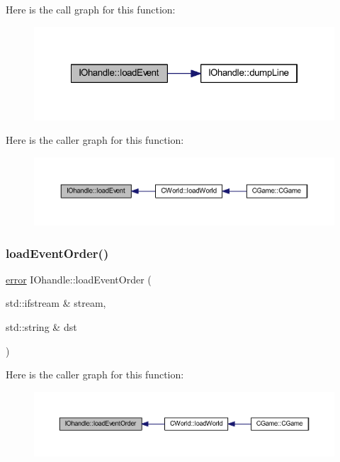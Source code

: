 Here is the call graph for this function\+:\nopagebreak
\begin{figure}[H]
\begin{center}
\leavevmode
\includegraphics[width=322pt]{class_i_ohandle_a42f66760fa3e33400921dcb8d9a8cd57_cgraph}
\end{center}
\end{figure}
Here is the caller graph for this function\+:\nopagebreak
\begin{figure}[H]
\begin{center}
\leavevmode
\includegraphics[width=350pt]{class_i_ohandle_a42f66760fa3e33400921dcb8d9a8cd57_icgraph}
\end{center}
\end{figure}
\mbox{\label{class_i_ohandle_a8d076d0076c358e63e1e993309c35b2a}} 
\subsubsection{\texorpdfstring{load\+Event\+Order()}{loadEventOrder()}}
{\footnotesize\ttfamily \mbox{\hyperlink{_errors_list_8h_af10dacfa214e2575bb2e0ee407c242e0}{error}} I\+Ohandle\+::load\+Event\+Order (\begin{DoxyParamCaption}\item[{std\+::ifstream \&}]{stream,  }\item[{std\+::string \&}]{dst }\end{DoxyParamCaption})}

Here is the caller graph for this function\+:\nopagebreak
\begin{figure}[H]
\begin{center}
\leavevmode
\includegraphics[width=350pt]{class_i_ohandle_a8d076d0076c358e63e1e993309c35b2a_icgraph}
\end{center}
\end{figure}
\mbox{\label{class_i_ohandle_a4870dc9635a6c30ef483d699dffd8774}} 
